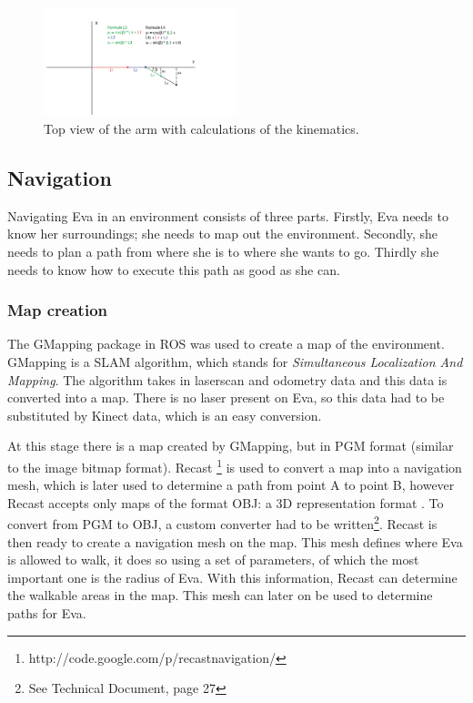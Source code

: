 \documentclass[project_eva.tex]{subfiles}
\begin{document}
\begin{figure}[h]
	\centering
	\mbox{\includegraphics[width=0.5\textwidth]{Images/2d_bovenaanzicht.png}}
	\caption{Top view of the arm with calculations of the kinematics.}
	\label{fig:IK1}
\end{figure}

\subsection*{Navigation}
Navigating Eva in an environment consists of three parts. Firstly, Eva needs to know her surroundings; she needs to map out 
the environment. Secondly, she needs to plan a path from where she is to where she wants to go. Thirdly she needs to know 
how to execute this path as good as she can.

\subsubsection*{Map creation}
The GMapping package in ROS was used to create a map of the environment. GMapping \cite{GMapping} is a SLAM algorithm, 
which stands for \textit{Simultaneous Localization And Mapping}. The algorithm takes in laserscan and odometry data and 
this data is converted into a map. There is no laser present on Eva, so this data had to be substituted by Kinect data, 
which is an easy conversion.

At this stage there is a map created by GMapping, but in PGM format (similar to the image bitmap format). Recast 
\footnote{http://code.google.com/p/recastnavigation/} is used to convert a map into a navigation mesh, which is later used 
to determine a path from point A to point B, however Recast accepts only maps of the format OBJ: a 3D representation 
format \cite{wavefront}. To convert from PGM to OBJ, a custom converter had to be written\footnote{See Technical Document, page 27}. Recast is then ready to create a navigation mesh on the map. This mesh defines where 
Eva is allowed to walk, it does so using a set of parameters, of which the most important one is the radius of Eva. With 
this information, Recast can determine the walkable areas in the map. This mesh can later on be used to determine paths for Eva.
\end{document}
